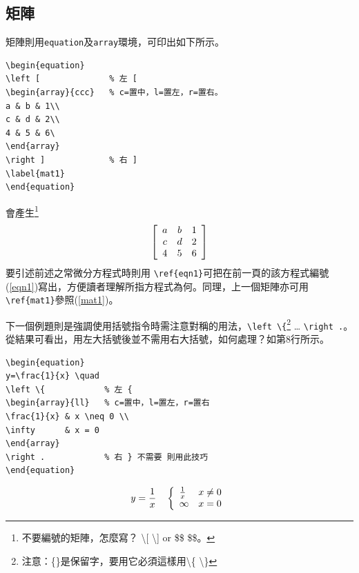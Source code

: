 \subsection{矩陣}
矩陣則用{\tt equation}及{\tt array}環境，可印出如下所示。\\ 
\begin{Verbatim}[frame=single,firstline=1,label=Every matrix]
\begin{equation}
\left [              % 左 [
\begin{array}{ccc}   % c=置中，l=置左，r=置右。
a & b & 1\\
c & d & 2\\
4 & 5 & 6\
\end{array}
\right ]             % 右 ]
\label{mat1}
\end{equation}
\end{Verbatim}
會產生\footnote{不要編號的矩陣，怎麼寫？  \textbackslash [ \textbackslash ] or \$\$ \$\$。} 
\begin{equation}
\left [
\begin{array}{ccc}  \index{\LaTeX 環境!array}
a & b & 1\\
c & d & 2\\
4 & 5 & 6
\end{array}
\right ]
\label{mat1} \index{\LaTeX!\textbackslash label}\index{\LaTeX!\textbackslash ref}
\end{equation}
要引述前述之常微分方程式時則用 \verb|\ref{eqn1}|可把在前一頁的該方程式編號(\ref{eqn1})寫出，方便讀者理解所指方程式為何。同理，上一個矩陣亦可用\verb|\ref{mat1}|參照(\ref{mat1})。

下一個例題則是強調使用括號指令時需注意對稱的用法，\verb|\left \{|\footnote{注意：\{\}是保留字，要用它必須這樣用\textbackslash \{ \textbackslash \}} \ldots
\verb|\right .|。從結果可看出，用左大括號後並不需用右大括號，如何處理？如第8行所示。

\begin{Verbatim}[frame=single,firstline=1,label=Pairs]
\begin{equation}
y=\frac{1}{x} \quad  
\left \{            % 左 {
\begin{array}{ll}   % c=置中，l=置左，r=置右
\frac{1}{x} & x \neq 0 \\  
\infty      & x = 0
\end{array}
\right .            % 右 } 不需要 則用此技巧
\end{equation}
\end{Verbatim}
\begin{equation}
y=\frac{1}{x} \quad  \index{\LaTeX!\textbackslash quad}
\left \{
\begin{array}{ll}   
\frac{1}{x} & x \neq 0 \\
\infty      & x = 0  \index{\LaTeX!\textbackslash neq}
\end{array}
\right .            
\end{equation}
